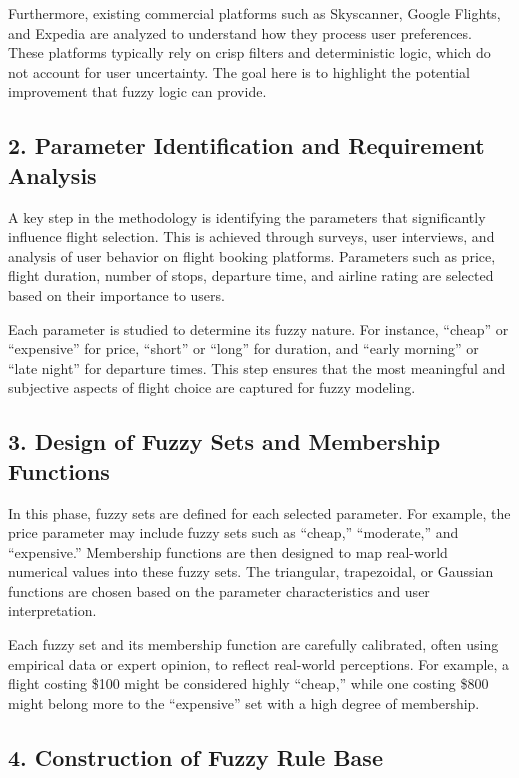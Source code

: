 \documentclass[a4paper]{article}
\begin{document}
Furthermore, existing commercial platforms such as Skyscanner, Google Flights, and Expedia are analyzed to understand how they process user preferences. These platforms typically rely on crisp filters and deterministic logic, which do not account for user uncertainty. The goal here is to highlight the potential improvement that fuzzy logic can provide.

\subsection*{2. Parameter Identification and Requirement Analysis}

A key step in the methodology is identifying the parameters that significantly influence flight selection. This is achieved through surveys, user interviews, and analysis of user behavior on flight booking platforms. Parameters such as price, flight duration, number of stops, departure time, and airline rating are selected based on their importance to users.

Each parameter is studied to determine its fuzzy nature. For instance, “cheap” or “expensive” for price, “short” or “long” for duration, and “early morning” or “late night” for departure times. This step ensures that the most meaningful and subjective aspects of flight choice are captured for fuzzy modeling.

\subsection*{3. Design of Fuzzy Sets and Membership Functions}

In this phase, fuzzy sets are defined for each selected parameter. For example, the price parameter may include fuzzy sets such as “cheap,” “moderate,” and “expensive.” Membership functions are then designed to map real-world numerical values into these fuzzy sets. The triangular, trapezoidal, or Gaussian functions are chosen based on the parameter characteristics and user interpretation.

Each fuzzy set and its membership function are carefully calibrated, often using empirical data or expert opinion, to reflect real-world perceptions. For example, a flight costing \$100 might be considered highly “cheap,” while one costing \$800 might belong more to the “expensive” set with a high degree of membership.

\subsection*{4. Construction of Fuzzy Rule Base}
\end{document}
